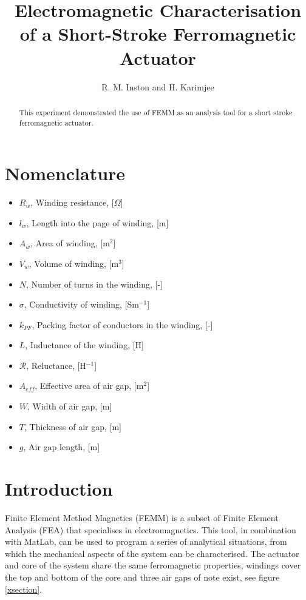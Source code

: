 \documentclass[a4paper]{IEEEtran}
\begin{document}
\title{Electromagnetic Characterisation of a Short-Stroke Ferromagnetic Actuator}
\author{R. M. Inston and H. Karimjee}

\maketitle
\begin{abstract}
This experiment demonstrated the use of FEMM as an analysis tool for a short stroke ferromagnetic actuator. 
\end{abstract}

\section{Nomenclature}
\begin{itemize}
\item[]{$R_{w}$, Winding resistance, [$\Omega$]}
\item[]{$l_{w}$, Length into the page of winding, [m]}
\item[]{$A_{w}$, Area of winding, [m$^{2}$]}
\item[]{$V_{w}$, Volume of winding, [m$^{3}$]}
\item[]{$N$, Number of turns in the winding, [-]}
\item[]{$\sigma$, Conductivity of winding, [Sm$^{-1}$]}
\item[]{$k_{PF}$, Packing factor of conductors in the winding, [-]}
\item[]{$L$, Inductance of the winding, [H]}
\item[]{$\mathcal{R}$, Reluctance, [H$^{-1}$]}
\item[]{$A_{eff}$, Effective area of air gap, [m$^{2}$]}
\item[]{$W$, Width of air gap, [m]}
\item[]{$T$, Thickness of air gap, [m]}
\item[]{$g$, Air gap length, [m]}
\end{itemize}

\section{Introduction}
Finite Element Method Magnetics (FEMM) is a subset of Finite Element Analysis (FEA) that specialises in electromagnetics. This tool, in combination with MatLab, can be used to program a series of analytical situations, from which the mechanical aspects of the system can be characterised. The actuator and core of the system share the same ferromagnetic properties, windings cover the top and bottom of the core and three air gaps of note exist, see figure \ref{xsection}.
\end{document}
